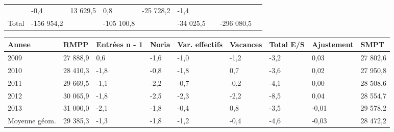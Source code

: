 \begin{longtable}[]{@{}lllllllll@{}}
\begin{minipage}[t]{0.16\columnwidth}
\end{minipage} & \begin{minipage}[t]{0.06\columnwidth}\raggedright
-0,4\strut
\end{minipage} & \begin{minipage}[t]{0.12\columnwidth}\raggedright
13 629,5\strut
\end{minipage} & \begin{minipage}[t]{0.06\columnwidth}\raggedright
0,8\strut
\end{minipage} & \begin{minipage}[t]{0.09\columnwidth}\raggedright
-25 728,2\strut
\end{minipage} & \begin{minipage}[t]{0.06\columnwidth}\raggedright
-1,4\strut
\end{minipage}\tabularnewline
\begin{minipage}[t]{0.05\columnwidth}\raggedright
Total\strut
\end{minipage} & \begin{minipage}[t]{0.10\columnwidth}\raggedright
-156 954,2\strut
\end{minipage} & \begin{minipage}[t]{0.06\columnwidth}\raggedright
\strut
\end{minipage} & \begin{minipage}[t]{0.16\columnwidth}\raggedright
-105 100,8\strut
\end{minipage} & \begin{minipage}[t]{0.06\columnwidth}\raggedright
\strut
\end{minipage} & \begin{minipage}[t]{0.12\columnwidth}\raggedright
-34 025,5\strut
\end{minipage} & \begin{minipage}[t]{0.06\columnwidth}\raggedright
\strut
\end{minipage} & \begin{minipage}[t]{0.09\columnwidth}\raggedright
-296 080,5\strut
\end{minipage} & \begin{minipage}[t]{0.06\columnwidth}\raggedright
\strut
\end{minipage}\tabularnewline
\bottomrule
\end{longtable}

\begin{longtable}[]{@{}lllllllll@{}}
\toprule
Annee & RMPP & Entrées n - 1 & Noria & Var. effectifs & Vacances & Total
E/S & Ajustement & SMPT\tabularnewline
\midrule
\endhead
2009 & 27 888,9 & 0,6 & -1,6 & -1,0 & -1,2 & -3,2 & 0,03 & 27
802,6\tabularnewline
2010 & 28 410,3 & -1,8 & -0,8 & -1,8 & 0,7 & -3,6 & 0,02 & 27
950,8\tabularnewline
2011 & 29 669,5 & -1,1 & -2,2 & -0,7 & -0,2 & -4,1 & 0,00 & 28
508,6\tabularnewline
2012 & 30 065,9 & -1,8 & -2,5 & -2,3 & -2,2 & -8,5 & 0,04 & 28
554,7\tabularnewline
2013 & 31 000,0 & -2,1 & -1,8 & -0,4 & 0,8 & -3,5 & -0,01 & 29
578,2\tabularnewline
Moyenne géom. & 29 385,3 & -1,3 & -1,8 & -1,2 & -0,4 & -4,6 & -0,03 & 28
472,2\tabularnewline
\bottomrule
\end{longtable}

